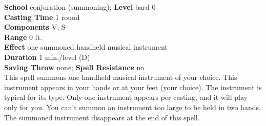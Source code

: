 \textbf{School} conjuration (summoning); \textbf{Level} bard 0\\
\textbf{Casting Time} 1 round\\
\textbf{Components} V, S\\
\textbf{Range} 0 ft.\\
\textbf{Effect} one summoned handheld musical instrument\\
\textbf{Duration} 1 min./level (D)\\
\textbf{Saving Throw} none; \textbf{Spell Resistance} no\\
This spell summons one handheld musical instrument of your choice. This instrument appears in your hands or at your feet (your choice). The instrument is typical for its type. Only one instrument appears per casting, and it will play only for you. You can't summon an instrument too large to be held in two hands. The summoned instrument disappears at the end of this spell.\\
